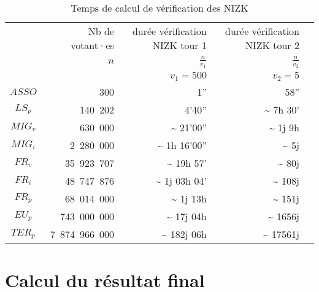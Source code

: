 \documentclass[../report]{subfiles}
\begin{document}
\begin{table}[H]
	\begin{center}
		\begin{tabular}{|c|r|r|r|r|}
			\hline
			& Nb de votant·es      &   durée vérification NIZK tour 1    &   durée vérification NIZK tour 2         \\
			& $n$                  & $\frac{n}{v_1}$                     & $\frac{n}{v_2}$ \\
			\hline
			&                      & $v_1 = 500$                         & $v_2 = 5$         \\
			\hline
			\hline
			$ASSO$  &           300 &                                 1''           &                            58''           \\
			$LS_p$  &       140~202 &                              4'40''           & \textasciitilde{}    7h 30'\phantom{27''}           \\
			$MIG_v$ &       630~000 &  \textasciitilde{}          21'00''           & \textasciitilde{} 1j 9h \phantom{00'27''}               \\
			$MIG_i$ &     2~280~000 &  \textasciitilde{}       1h 16'00''           & \textasciitilde{} 5j    \phantom{10h 00'27''}                \\
			$FR_v$  &    35~923~707 &  \textasciitilde{}      19h 57'\phantom{27''} & \textasciitilde{} 80j   \phantom{10h 00'27''}                \\
			$FR_i$  &    48~747~876 &  \textasciitilde{}   1j 03h 04'\phantom{56''} & \textasciitilde{} 108j  \phantom{10h 00'27''}                 \\
			$FR_p$  &    68~014~000 &  \textasciitilde{}   1j 13h \phantom{47'08''} & \textasciitilde{} 151j   \phantom{10h 00'27''}               \\
			$EU_p$  &   743~000~000 &  \textasciitilde{}  17j 04h \phantom{46'40''} & \textasciitilde{} 1656j  \phantom{10h 00'27''}                     \\
			$TER_p$ & 7~874~966~000 &  \textasciitilde{} 182j 06h \phantom{58'52''} & \textasciitilde{} 17561j \phantom{10h 00'27''}                \\
			\hline
		\end{tabular}
	\end{center}
	\caption{Temps de calcul de vérification des NIZK}\label{tab:verif:nizk}
\end{table}


\section{Calcul du résultat final}\label{sec:res:perf:resultat}
\end{document}
